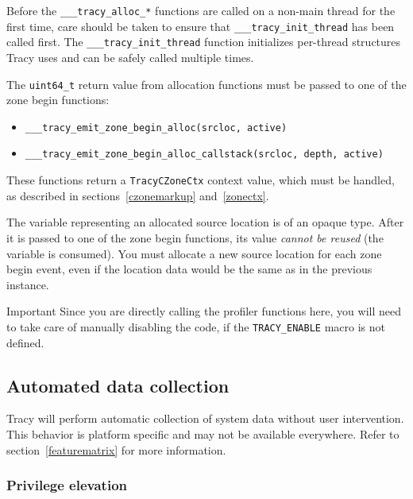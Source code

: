\documentclass[hidelinks,titlepage,a4paper]{article}
\begin{document}
Before the \texttt{\_\_\_tracy\_alloc\_*} functions are called on a non-main thread for the first
time, care should be taken to ensure that \texttt{\_\_\_tracy\_init\_thread} has been called first.
The \texttt{\_\_\_tracy\_init\_thread} function initializes per-thread structures Tracy uses and
can be safely called multiple times.

The \texttt{uint64\_t} return value from allocation functions must be passed to one of the zone
begin functions:

\begin{itemize}
\item \texttt{\_\_\_tracy\_emit\_zone\_begin\_alloc(srcloc, active)}
\item \texttt{\_\_\_tracy\_emit\_zone\_begin\_alloc\_callstack(srcloc, depth, active)}
\end{itemize}


These functions return a \texttt{TracyCZoneCtx} context value, which must be handled, as described
in sections~\ref{czonemarkup} and~\ref{zonectx}.

The variable representing an allocated source location is of an opaque type. After it is passed to one of the zone begin functions, its value \emph{cannot be reused} (the variable is consumed). You must allocate a new source location for each zone begin event, even if the location data would be the same as in the previous instance.

\begin{bclogo}[
noborder=true,
couleur=black!5,
logo=\bcbombe
]{Important}
Since you are directly calling the profiler functions here, you will need to take care of manually
disabling the code, if the \texttt{TRACY\_ENABLE} macro is not defined.
\end{bclogo}

\subsection{Automated data collection}
\label{automated}

Tracy will perform automatic collection of system data without user intervention. This behavior is platform specific and may not be available everywhere. Refer to section~\ref{featurematrix} for more information.

\subsubsection{Privilege elevation}
\label{privilegeelevation}
\end{document}
